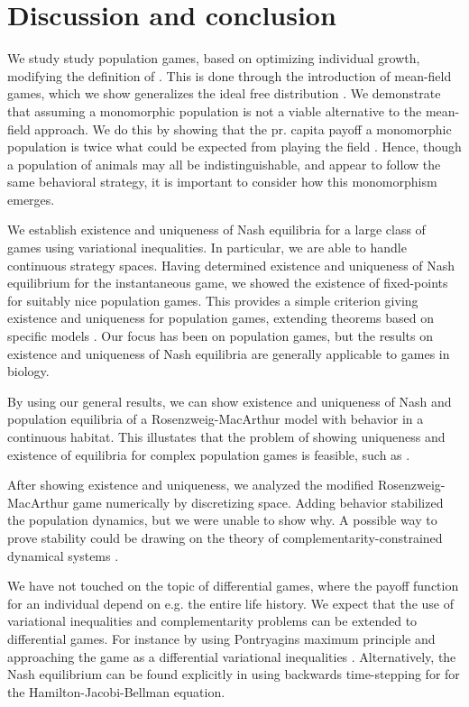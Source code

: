 \section{Discussion and conclusion}

We study study population games, based on optimizing individual growth, modifying the definition of \citep{vincent2005evolutionary}. This is done through the introduction of mean-field games, which we show generalizes the ideal free distribution \citep{fretwell1969territorial}. We demonstrate that assuming a monomorphic population is not a viable alternative to the mean-field approach. We do this by showing that the pr. capita payoff a monomorphic population is twice what could be expected from playing the field  \citep{parker1978searching} . Hence, though a population of animals may all be indistinguishable, and appear to follow the same behavioral strategy, it is important to consider how this monomorphism emerges.

We establish existence and uniqueness of Nash equilibria for a large class of games using variational inequalities. In particular, we are able to handle continuous strategy spaces. Having determined existence and uniqueness of Nash equilibrium for the instantaneous game, we showed the existence of fixed-points for suitably nice population games. This provides a simple criterion giving existence and uniqueness for population games, extending theorems based on specific models \citep{cressman2010ideal,sandholm2010population}. Our focus has been on population games, but the results on existence and uniqueness of Nash equilibria are generally applicable to games in biology.


By using our general results, we can show existence and uniqueness of Nash and population equilibria of a Rosenzweig-MacArthur model with behavior in a continuous habitat. This illustates that the problem of showing uniqueness and existence of equilibria for complex population games is feasible, such as \cite{pinti2019trophic}.


After showing existence and uniqueness, we analyzed the modified Rosenzweig-MacArthur game numerically by discretizing space. Adding behavior stabilized the population dynamics, but we were unable to show why. A possible way to prove stability could be drawing on the theory of complementarity-constrained dynamical systems \citep{adly2018variational,brogliato2020dynamical}.

We have not touched on the topic of differential games, where the payoff function for an individual depend on e.g. the entire life history. We expect that the use of variational inequalities and complementarity problems can be extended to differential games. For instance by using Pontryagins maximum principle and approaching the game as a differential variational inequalities \citep{pang2008differential}. Alternatively, the Nash equilibrium can be found explicitly in using backwards time-stepping for for the Hamilton-Jacobi-Bellman equation.


